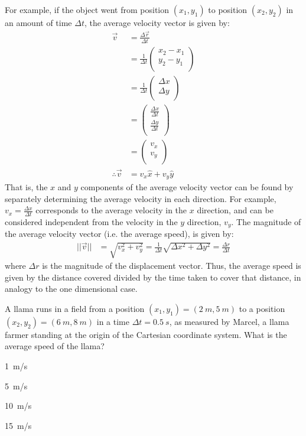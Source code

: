 For example, if the object went from position $(x_1,y_1)$ to position $(x_2,y_2)$ in an amount of time $\Delta t$, the average velocity vector is given by:
\begin{align*}
\vec v &= \frac{\Delta \vec r}{\Delta t}\\
&=\frac{1}{\Delta t}\begin{pmatrix}
           x_2-x_1 \\
           y_2-y_1 \\
         \end{pmatrix}\\
 &=\frac{1}{\Delta t}\begin{pmatrix}
           \Delta x \\
           \Delta y \\
         \end{pmatrix}\\     
 &=\begin{pmatrix}
           \frac{\Delta x}{\Delta t} \\
           \frac{\Delta y}{\Delta t}\\
         \end{pmatrix}\\       
 &=\begin{pmatrix}
           v_x \\
           v_y \\
         \end{pmatrix}\\    
\therefore \vec v &= v_x\hat x+v_y\hat y                     
\end{align*}
That is, the $x$ and $y$ components of the average velocity vector can be found by separately determining the average velocity in each direction. For example, $v_x=\frac{\Delta x}{\Delta t}$ corresponds to the average velocity in the $x$ direction, and can be considered independent from the velocity in the $y$ direction, $v_y$. The magnitude of the average velocity vector (i.e. the average speed), is given by:
\begin{align*}
||\vec v||&=\sqrt{v_x^2+v_y^2}=\frac{1}{\Delta t}\sqrt{\Delta x^2+\Delta y^2}=\frac{\Delta r}{\Delta t}
\end{align*}
where $\Delta r$ is the magnitude of the displacement vector. Thus, the average speed is given by the distance covered divided by the time taken to cover that distance, in analogy to the one dimensional case.

\begin{checkpointMC}{A llama runs in a field from a position $(x_1,y_1)=(\SI{2}{m},\SI{5}{m})$ to a position $(x_2,y_2)=(\SI{6}{m},\SI{8}{m})$ in a time $\Delta t=\SI{0.5}{s}$, as measured by Marcel, a llama farmer standing at the origin of the Cartesian coordinate system. What is the average speed of the llama?}
\item \SI{1}{m/s}
\item \SI{5}{m/s}
\item \SI{10}{m/s}%
\item \SI{15}{m/s}
\end{checkpointMC}


